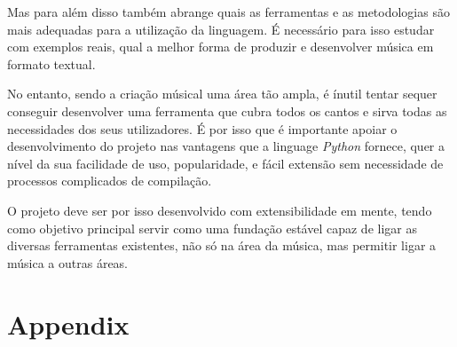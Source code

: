 \documentclass[
  oneside,
  11pt, a4paper,
  footinclude=true,
  headinclude=true,
  cleardoublepage=empty
]{scrbook}
\begin{document}
	Mas para além disso também abrange quais as ferramentas e as metodologias são mais adequadas para a utilização da linguagem. É necessário para isso estudar com exemplos reais, qual a melhor forma de produzir e desenvolver música em formato textual.
	
	No entanto, sendo a criação músical uma área tão ampla, é ínutil tentar sequer conseguir desenvolver uma ferramenta que cubra todos os cantos e sirva todas as necessidades dos seus utilizadores. É por isso que é importante apoiar o desenvolvimento do projeto nas vantagens que a linguage \textit{Python} fornece, quer a nível da sua facilidade de uso, popularidade, e fácil extensão sem necessidade de processos complicados de compilação.
	
	O projeto deve ser por isso desenvolvido com extensibilidade em mente, tendo como objetivo principal servir como uma fundação estável capaz de ligar as diversas ferramentas existentes, não só na área da música, mas permitir ligar a música a outras áreas.
    

	

	
	
	
	\chapter{Appendix}
\end{document}
